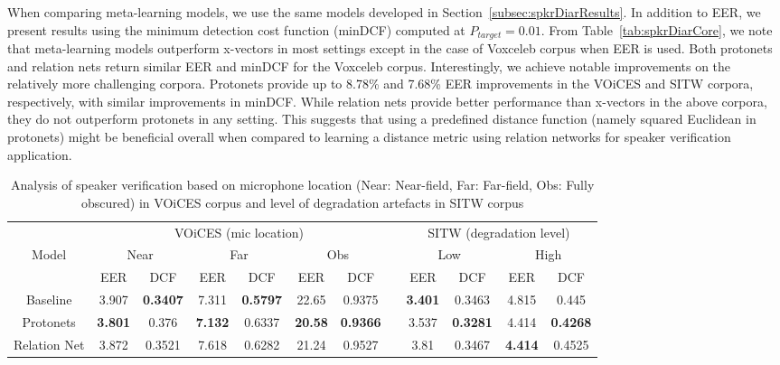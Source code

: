 When comparing meta-learning models, we use the same models developed in Section~\ref{subsec:spkrDiarResults}. In addition to EER, we present results using the minimum detection cost function (minDCF) computed at $P_{target} = 0.01$. From Table~\ref{tab:spkrDiarCore}, we note that meta-learning models outperform x-vectors in most settings except in the case of Voxceleb corpus when EER is used. Both protonets and relation nets return similar EER and minDCF for the Voxceleb corpus. Interestingly, we achieve notable improvements on the relatively more challenging corpora. Protonets provide up to 8.78\% and 7.68\% EER improvements in the VOiCES and SITW corpora, respectively, with similar improvements in minDCF. While relation nets provide better performance than x-vectors in the above corpora, they do not outperform protonets in any setting. This suggests that using a predefined distance function (namely squared Euclidean in protonets) might be beneficial overall when compared to learning a distance metric using relation networks for speaker verification application.

\begin{table}[h]
\caption{Analysis of speaker verification based on microphone location (Near: Near-field, Far: Far-field, Obs: Fully obscured) in VOiCES corpus and level of degradation artefacts in SITW corpus}
\label{tab:spkrVerRobust}
\centering
\begin{tabular}{cccccccccccc} \\ \hline
 & \multicolumn{6}{c}{VOiCES (mic location)} &  & \multicolumn{4}{c}{SITW (degradation level)} \\ \cline{2-7} \cline{9-12}
\rule{0pt}{2ex} 
Model & \multicolumn{2}{c}{Near} & \multicolumn{2}{c}{Far} & \multicolumn{2}{c}{Obs} &  & \multicolumn{2}{c}{Low} & \multicolumn{2}{c}{High} \\
 & EER & DCF & EER & DCF & EER & DCF &  & EER & DCF & EER & DCF \\ \hline
\rule{0pt}{3ex} Baseline & 3.907 & \textbf{0.3407} & 7.311 & \textbf{0.5797} & 22.65 & 0.9375 &  & \textbf{3.401} & 0.3463 & 4.815 & 0.445 \\
\rule{0pt}{3ex} Protonets & \textbf{3.801} & 0.376 & \textbf{7.132} & 0.6337 & \textbf{20.58} & \textbf{0.9366} & & 3.537 & \textbf{0.3281} & 4.414 & \textbf{0.4268} \\
\rule{0pt}{3ex} Relation Net & 3.872 & 0.3521 & 7.618 & 0.6282 & 21.24 & 0.9527 &  & 3.81 & 0.3467 & \textbf{4.414} & 0.4525 \\ \hline
\end{tabular}
\end{table}

